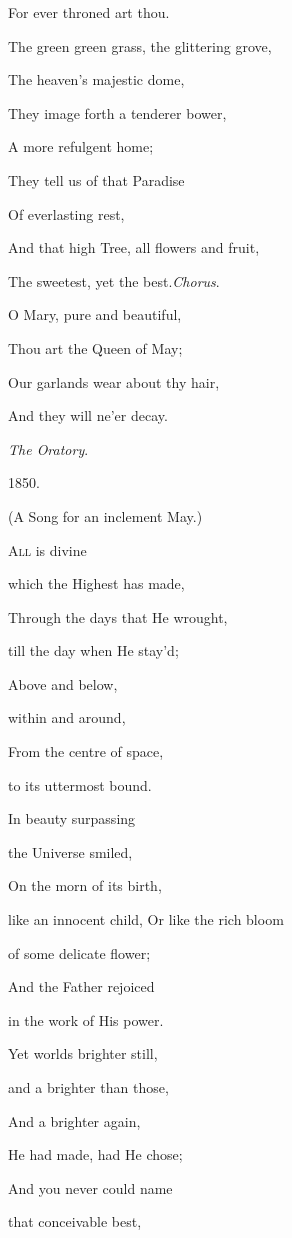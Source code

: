 For ever throned art thou.

The green green grass, the glittering grove,

The heaven's majestic dome,

They image forth a tenderer bower,

A more refulgent home;

They tell us of that Paradise

Of everlasting rest,

And that high Tree, all flowers and fruit,

The sweetest, yet the best.\emph{Chorus}.

O Mary, pure and beautiful,

Thou art the Queen of May;

Our garlands wear about thy hair,

And they will ne'er decay.

\emph{The Oratory}.

1850.


(A Song for an inclement May.)

A\textsc{ll} is divine

which the Highest has made,

Through the days that He wrought,

till the day when He stay'd;

Above and below,

within and around,

From the centre of space,

to its uttermost bound.

In beauty surpassing

the Universe smiled,

On the morn of its birth,

like an innocent child, Or like the rich bloom

of some delicate flower;

And the Father rejoiced

in the work of His power.

Yet worlds brighter still,

and a brighter than those,

And a brighter again,

He had made, had He chose;

And you never could name

that conceivable best,

